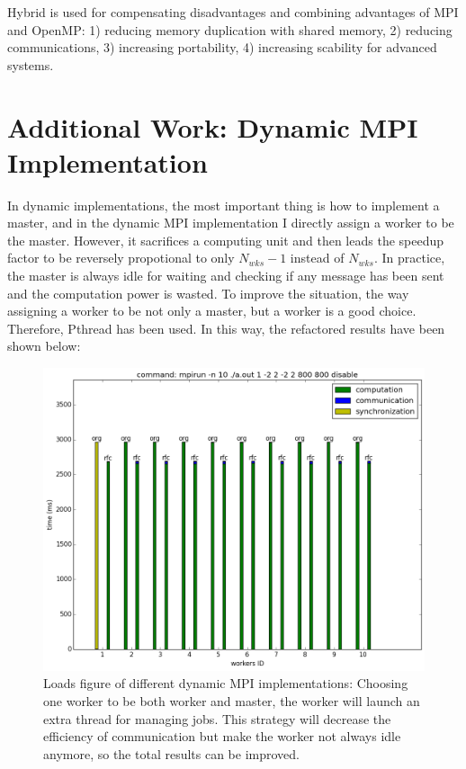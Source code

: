 \documentclass[12pt]{article}
\begin{document}
Hybrid is used for compensating disadvantages and combining advantages of MPI and OpenMP: 1) reducing memory duplication with shared memory, 2) reducing communications, 3) increasing portability, 4) increasing scability for advanced systems.

\section*{Additional Work: Dynamic MPI Implementation}
\vspace{-20pt}
\noindent\makebox[\linewidth]{\rule{\textwidth}{0.4pt}}
\vspace{5pt}

In dynamic implementations, the most important thing is how to implement a master, and in the dynamic MPI implementation I directly assign a worker to be the master. However, it sacrifices a computing unit and then leads the speedup factor to be reversely propotional to only $N_{wks}-1$ instead of $N_{wks}$. In practice, the master is always idle for waiting and checking if any message has been sent and the computation power is wasted. To improve the situation, the way assigning a worker to be not only a master, but a worker is a good choice. Therefore, Pthread has been used. In this way, the refactored results have been shown below:

\begin{figure}
    \includegraphics[scale=.45]{./threads_load_MPI_dyn_rfact.png}
    \vspace{-.5cm}
    \caption{Loads figure of different dynamic MPI implementations: Choosing one worker to be both worker and master, the worker will launch an extra thread for managing jobs. This strategy will decrease the efficiency of communication but make the worker not always idle anymore, so the total results can be improved.}
\end{figure}
\end{document}
